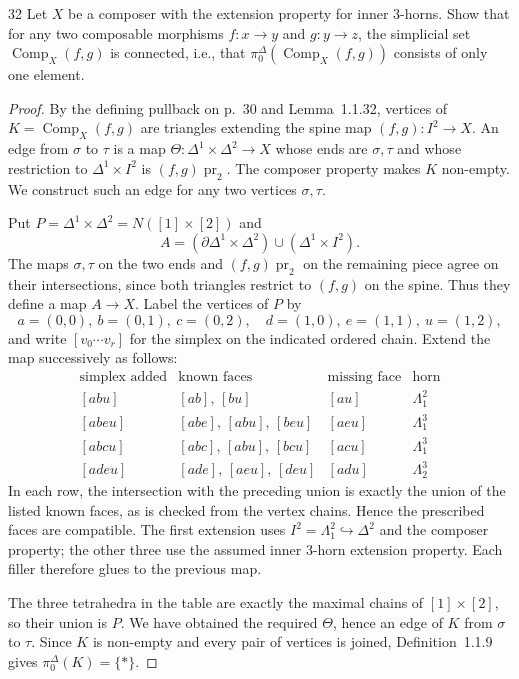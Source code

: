 \begin{exercise}{32}
Let $X$ be a composer with the extension property for inner $3$-horns. Show
that for any two composable morphisms $f\colon x\to y$ and $g\colon y\to z$, the
simplicial set $\operatorname{Comp}_X(f,g)$ is connected, i.e., that
$\pi_0^\Delta(\operatorname{Comp}_X(f,g))$ consists of only one element.

\begin{proof}
By the defining pullback on p.~30 and Lemma~1.1.32, vertices
of $K=\operatorname{Comp}_X(f,g)$ are triangles extending the
spine map $(f,g)\colon I^2\to X$. An edge from $\sigma$ to $\tau$
is a map $\Theta\colon\Delta^1\times\Delta^2\to X$ whose ends
are $\sigma,\tau$ and whose restriction to $\Delta^1\times I^2$
is $(f,g)\operatorname{pr}_2$.
The composer property makes $K$ non-empty. We construct such
an edge for any two vertices $\sigma,\tau$.

Put $P=\Delta^1\times\Delta^2=N([1]\times[2])$ and
\[
 A=(\partial\Delta^1\times\Delta^2)\cup(\Delta^1\times I^2).
\]
The maps $\sigma,\tau$ on the two ends and
$(f,g)\operatorname{pr}_2$ on the remaining piece agree on
their intersections, since both triangles restrict to $(f,g)$
on the spine. Thus they define a map $A\to X$.
Label the vertices of $P$ by
\[
 a=(0,0),\ b=(0,1),\ c=(0,2),\quad
 d=(1,0),\ e=(1,1),\ u=(1,2),
\]
and write $[v_0\cdots v_r]$ for the simplex on the indicated
ordered chain. Extend the map successively as follows:
\[
 \begin{array}{c|c|c|c}
  \text{simplex added}&\text{known faces}&\text{missing face}&\text{horn}\\ \hline
  [abu]&[ab],\,[bu]&[au]&\Lambda_1^2\\[0pt]
  [abeu]&[abe],\,[abu],\,[beu]&[aeu]&\Lambda_1^3\\[0pt]
  [abcu]&[abc],\,[abu],\,[bcu]&[acu]&\Lambda_1^3\\[0pt]
  [adeu]&[ade],\,[aeu],\,[deu]&[adu]&\Lambda_2^3
 \end{array}
\]
In each row, the intersection with the preceding union is
exactly the union of the listed known faces, as is checked
from the vertex chains. Hence the prescribed faces are
compatible. The first extension uses
$I^2=\Lambda_1^2\hookrightarrow\Delta^2$ and the composer
property; the other three use the assumed inner $3$-horn
extension property. Each filler therefore glues to the
previous map.

The three tetrahedra in the table are exactly the maximal
chains of $[1]\times[2]$, so their union is $P$.
We have obtained the required $\Theta$, hence an edge of $K$
from $\sigma$ to $\tau$. Since $K$ is non-empty and every pair
of vertices is joined, Definition~1.1.9 gives
$\pi_0^\Delta(K)=\{*\}$.
\end{proof}
\end{exercise}
